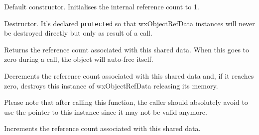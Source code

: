 



\label{wxobjectrefdatactor}


Default constructor. Initialises the internal reference count to 1.

\label{wxobjectrefdatadtor}


Destructor. It's declared {\tt protected} so that wxObjectRefData instances will never
be destroyed directly but only as result of a  call.

\label{wxobjectrefdatagetrefcount}


Returns the reference count associated with this shared data.
When this goes to zero during a  call, the object
will auto-free itself.

\label{wxobjectrefdatadecref}


Decrements the reference count associated with this shared data and, if it reaches zero,
destroys this instance of wxObjectRefData releasing its memory.

Please note that after calling this function, the caller should absolutely avoid to use
the pointer to this instance since it may not be valid anymore.

\label{wxobjectrefdataincref}


Increments the reference count associated with this shared data.

